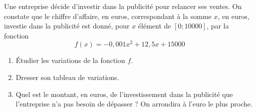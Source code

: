 
Une entreprise décide d'investir dans la publicité pour relancer ses ventes. On constate que le chiffre d'affaire, en euros, correspondant à la somme $x$, en euros, investie dans la publicité est donné, pour $x$ élément de $[0;10000]$, par la fonction $$f(x)=-0,001x^2+12,5x+15000$$
\begin{enumerate}
\item Étudier les variations de la fonction $f$.
\item Dresser son tableau de variations.
\item Quel est le montant, en euros, de l'investissement dans la publicité que l'entreprise n'a pas besoin de dépasser ? On arrondira à l'euro le plus proche.
\end{enumerate}
